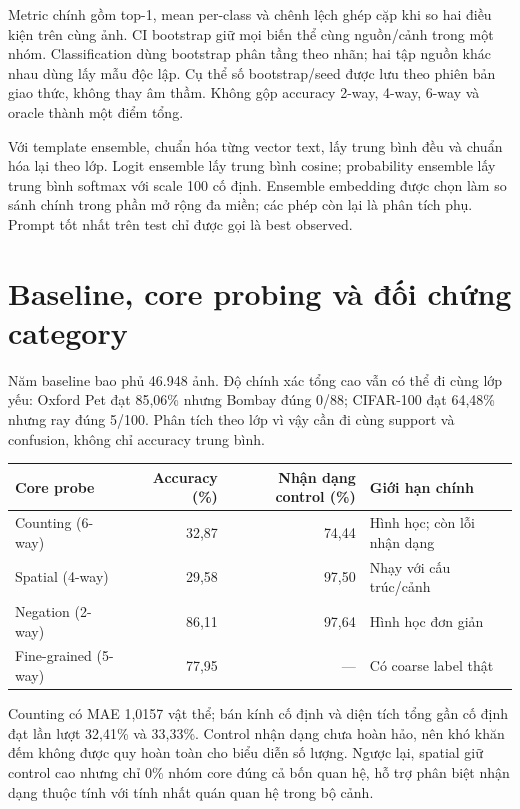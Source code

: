 \documentclass[11pt,a4paper]{article}
\begin{document}
Metric chính gồm top-1, mean per-class và chênh lệch ghép cặp khi so hai điều kiện trên cùng ảnh. CI bootstrap giữ mọi biến thể cùng nguồn/cảnh trong một nhóm. Classification dùng bootstrap phân tầng theo nhãn; hai tập nguồn khác nhau dùng lấy mẫu độc lập. Cụ thể số bootstrap/seed được lưu theo phiên bản giao thức, không thay âm thầm. Không gộp accuracy 2-way, 4-way, 6-way và oracle thành một điểm tổng.

Với template ensemble, chuẩn hóa từng vector text, lấy trung bình đều và chuẩn hóa lại theo lớp. Logit ensemble lấy trung bình cosine; probability ensemble lấy trung bình softmax với scale 100 cố định. Ensemble embedding được chọn làm so sánh chính trong phần mở rộng đa miền; các phép còn lại là phân tích phụ. Prompt tốt nhất trên test chỉ được gọi là best observed.

\newpage
\section{Baseline, core probing và đối chứng category}
Năm baseline bao phủ 46.948 ảnh. Độ chính xác tổng cao vẫn có thể đi cùng lớp yếu: Oxford Pet đạt 85,06\% nhưng Bombay đúng 0/88; CIFAR-100 đạt 64,48\% nhưng ray đúng 5/100. Phân tích theo lớp vì vậy cần đi cùng support và confusion, không chỉ accuracy trung bình.

\begin{center}\small
{}
\begin{tabular}{@{}lrrl@{}}\toprule
Core probe & Accuracy (\%) & Nhận dạng control (\%) & Giới hạn chính\\\midrule
Counting (6-way) & 32,87 & 74,44 & Hình học; còn lỗi nhận dạng\\
Spatial (4-way) & 29,58 & 97,50 & Nhạy với cấu trúc/cảnh\\
Negation (2-way) & 86,11 & 97,64 & Hình học đơn giản\\
Fine-grained (5-way) & 77,95 & --- & Có coarse label thật\\
\bottomrule\end{tabular}\end{center}

Counting có MAE 1,0157 vật thể; bán kính cố định và diện tích tổng gần cố định đạt lần lượt 32,41\% và 33,33\%. Control nhận dạng chưa hoàn hảo, nên khó khăn đếm không được quy hoàn toàn cho biểu diễn số lượng. Ngược lại, spatial giữ control cao nhưng chỉ 0\% nhóm core đúng cả bốn quan hệ, hỗ trợ phân biệt nhận dạng thuộc tính với tính nhất quán quan hệ trong bộ cảnh.
\end{document}
